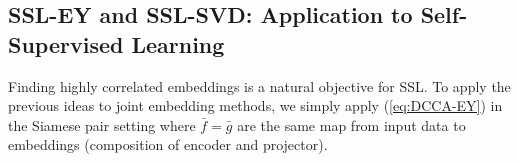 



\subsection{SSL-EY and SSL-SVD: Application to Self-Supervised Learning}

Finding highly correlated embeddings is a natural objective for SSL.
To apply the previous ideas to joint embedding methods, we simply apply (\ref{eq:DCCA-EY}) in the Siamese pair setting where $\bar{f}=\bar{g}$ are the same map from input data to embeddings (composition of encoder and projector).





